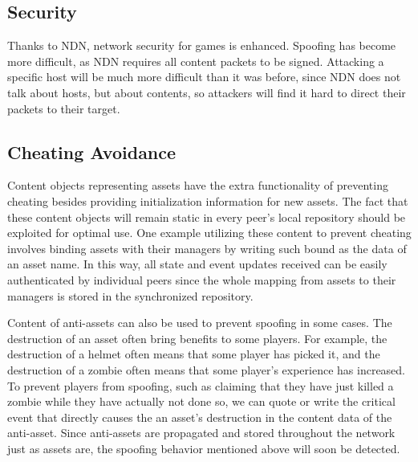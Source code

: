 \documentclass{sigchi}
\begin{document}
\subsection{Security}
Thanks to NDN, network security for games is enhanced. Spoofing has become more difficult, as NDN requires all content packets to be signed. Attacking a specific host will be much more difficult than it was before, since NDN does not talk about hosts, but about contents, so attackers will find it hard to direct their packets to their target.

\subsection{Cheating Avoidance}



Content objects representing assets have the extra functionality of preventing cheating besides providing initialization information for new assets. The fact that these content objects will remain static in every peer's local repository should be exploited for optimal use. One example utilizing these content to prevent cheating involves binding assets with their managers by writing such bound as the data of an asset name. In this way, all state and event updates received can be easily authenticated by individual peers since the whole mapping from assets to their managers is stored in the synchronized repository. 

Content of anti-assets can also be used to prevent spoofing in some cases. The destruction of an asset often bring benefits to some players. For example, the destruction of a helmet often means that some player has picked it, and the destruction of a zombie often means that some player's experience has increased. To prevent players from spoofing, such as claiming that they have just killed a zombie while they have actually not done so, we can quote or write the critical event that directly causes the an asset's destruction in the content data of the anti-asset. Since anti-assets are propagated and stored throughout the network just as assets are, the spoofing behavior mentioned above will soon be detected. 
\end{document}
